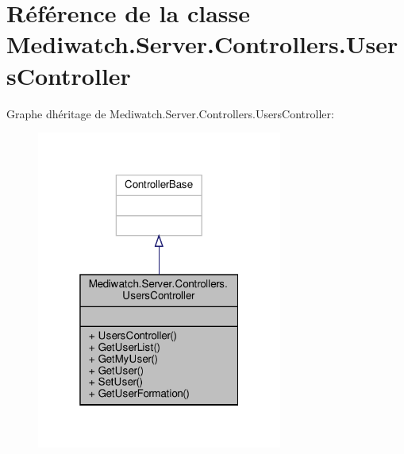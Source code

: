 \hypertarget{class_mediwatch_1_1_server_1_1_controllers_1_1_users_controller}{}\section{Référence de la classe Mediwatch.\+Server.\+Controllers.\+Users\+Controller}
\label{class_mediwatch_1_1_server_1_1_controllers_1_1_users_controller}


Graphe d\textquotesingle{}héritage de Mediwatch.\+Server.\+Controllers.\+Users\+Controller\+:
\nopagebreak
\begin{figure}[H]
\begin{center}
\leavevmode
\includegraphics[width=229pt]{class_mediwatch_1_1_server_1_1_controllers_1_1_users_controller__inherit__graph}
\end{center}
\end{figure}


